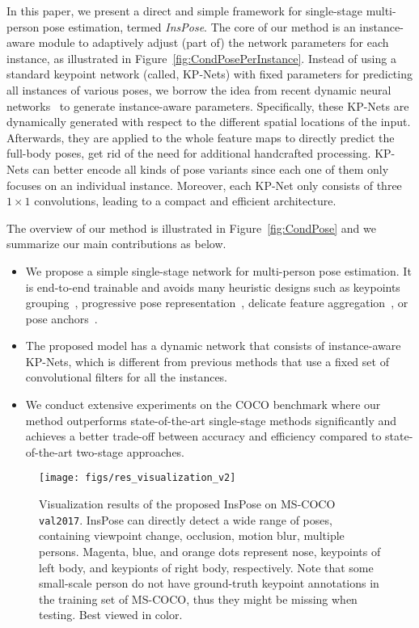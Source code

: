 \documentclass[sigconf]{acmart}
\begin{document}
In this paper, we present a direct and simple framework for single-stage multi-person pose estimation, termed \emph{InsPose}.
The core of our method is an instance-aware module to adaptively adjust (part of) the network parameters for each instance, as illustrated in Figure~\ref{fig:CondPosePerInstance}.
Instead of using a standard keypoint network (called, KP-Nets) with fixed parameters for predicting all instances of various poses, we borrow the idea from recent dynamic neural networks~\cite{yang2019condconv,Chen_2020_CVPR,DBLP:conf/nips/DenilSDRF13,jia2016dynamic} to generate instance-aware parameters.
Specifically, these KP-Nets are dynamically generated with respect to the different spatial locations of the input.
Afterwards, they are applied to the whole feature maps to directly predict the full-body poses, get rid of the need for additional handcrafted processing.
KP-Nets can better encode all kinds of pose variants since each one of them only focuses on an individual instance.
Moreover, each KP-Net only consists of three $1\times 1$ convolutions, leading to a compact and efficient architecture.

The overview of our method is illustrated in Figure~\ref{fig:CondPose} and we summarize our main contributions as below.

\begin{itemize}

\item We propose a simple single-stage network for multi-person pose estimation. It is end-to-end trainable and avoids many heuristic designs such as keypoints grouping~\cite{cheng2020higherhrnet}, progressive pose representation~\cite{nie2019single}, delicate feature aggregation~\cite{tian2019directpose}, or pose anchors~\cite{wei2020point}.

\item The proposed model has a dynamic network that consists of instance-aware KP-Nets, which is different from previous methods that use a fixed set of convolutional filters for all the instances.

\item We conduct extensive experiments on the COCO benchmark where our method outperforms state-of-the-art single-stage methods significantly and achieves a better trade-off between accuracy and efficiency compared to state-of-the-art two-stage approaches.

\end{itemize}


\begin{figure*}[t]
  \centering
  \texttt{[image: figs/res\_visualization\_v2]}
  \caption{Visualization results of the proposed InsPose on MS-COCO \texttt{val2017}. InsPose can directly detect a wide range of poses, containing viewpoint change, occlusion, motion blur, multiple persons. Magenta, blue, and orange dots represent nose, keypoints of left body, and keypionts of right body, respectively. Note that some small-scale person do not have ground-truth keypoint annotations in the training set of MS-COCO, thus they might be missing when testing. Best viewed in color.}
  \label{fig:CondPoseVisRes}
\end{figure*}
\end{document}
